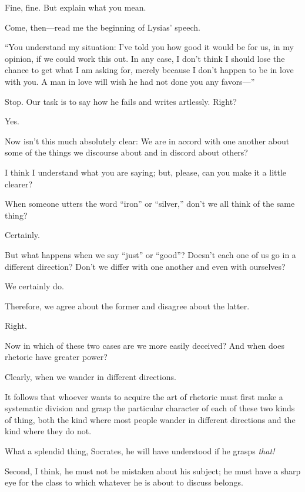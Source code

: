 \sayphaedrus Fine, fine. But explain what you mean.

\saysocrates Come, then---read me the beginning of Lysias' speech.

\sayphaedrus “You understand my situation: I've told you how good it 
would be for us, in my opinion, if we could work this out. In
any case, I don't think I should lose the chance to get what I am asking
for, merely because I don't happen to be in love with you. A man in love
will wish he had not done you any favors---”

\saysocrates Stop. Our task is to say how he fails and writes artlessly.
Right?

\sayphaedrus Yes.

\saysocrates Now isn't this much absolutely clear: We are in accord with
one another about some of the things we discourse about and in discord
about others?

\sayphaedrus I think I understand what you are saying; but, please, can you
make it a little clearer?

\saysocrates When someone utters the word “iron” or “silver,” don't we all
think of the same thing?

\sayphaedrus Certainly.

\saysocrates But what happens when we say “just” or “good”? Doesn't each
one of us go in a different direction? Don't we differ with one another
and even with ourselves?

\sayphaedrus We certainly do.

\saysocrates Therefore, we agree about the former and disagree
about the latter.

\sayphaedrus Right.

\saysocrates Now in which of these two cases are we more easily deceived?
And when does rhetoric have greater power?

\sayphaedrus Clearly, when we wander in different directions.

\saysocrates It follows that whoever wants to acquire the art of rhetoric
must first make a systematic division and grasp the particular character
of each of these two kinds of thing, both the kind where most people
wander in different directions and the kind where they do not.

\sayphaedrus What a splendid thing, Socrates, he will have
understood if he grasps {\em that!}

\saysocrates Second, I think, he must not be mistaken about his subject; he
must have a sharp eye for the class to which whatever he is about to
discuss belongs.


